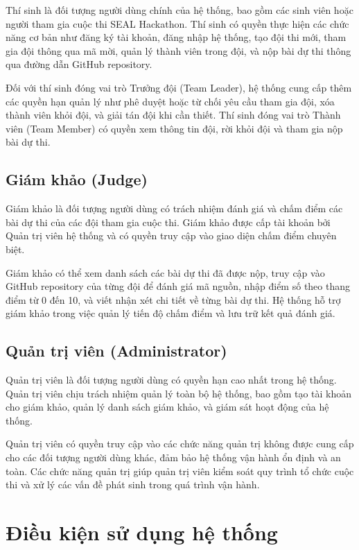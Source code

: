 Thí sinh là đối tượng người dùng chính của hệ thống, bao gồm các sinh viên hoặc người tham gia cuộc thi SEAL Hackathon. Thí sinh có quyền thực hiện các chức năng cơ bản như đăng ký tài khoản, đăng nhập hệ thống, tạo đội thi mới, tham gia đội thông qua mã mời, quản lý thành viên trong đội, và nộp bài dự thi thông qua đường dẫn GitHub repository.

Đối với thí sinh đóng vai trò Trưởng đội (Team Leader), hệ thống cung cấp thêm các quyền hạn quản lý như phê duyệt hoặc từ chối yêu cầu tham gia đội, xóa thành viên khỏi đội, và giải tán đội khi cần thiết. Thí sinh đóng vai trò Thành viên (Team Member) có quyền xem thông tin đội, rời khỏi đội và tham gia nộp bài dự thi.

\subsection{Giám khảo (Judge)}

Giám khảo là đối tượng người dùng có trách nhiệm đánh giá và chấm điểm các bài dự thi của các đội tham gia cuộc thi. Giám khảo được cấp tài khoản bởi Quản trị viên hệ thống và có quyền truy cập vào giao diện chấm điểm chuyên biệt.

Giám khảo có thể xem danh sách các bài dự thi đã được nộp, truy cập vào GitHub repository của từng đội để đánh giá mã nguồn, nhập điểm số theo thang điểm từ 0 đến 10, và viết nhận xét chi tiết về từng bài dự thi. Hệ thống hỗ trợ giám khảo trong việc quản lý tiến độ chấm điểm và lưu trữ kết quả đánh giá.

\subsection{Quản trị viên (Administrator)}

Quản trị viên là đối tượng người dùng có quyền hạn cao nhất trong hệ thống. Quản trị viên chịu trách nhiệm quản lý toàn bộ hệ thống, bao gồm tạo tài khoản cho giám khảo, quản lý danh sách giám khảo, và giám sát hoạt động của hệ thống.

Quản trị viên có quyền truy cập vào các chức năng quản trị không được cung cấp cho các đối tượng người dùng khác, đảm bảo hệ thống vận hành ổn định và an toàn. Các chức năng quản trị giúp quản trị viên kiểm soát quy trình tổ chức cuộc thi và xử lý các vấn đề phát sinh trong quá trình vận hành.


\section{Điều kiện sử dụng hệ thống}

